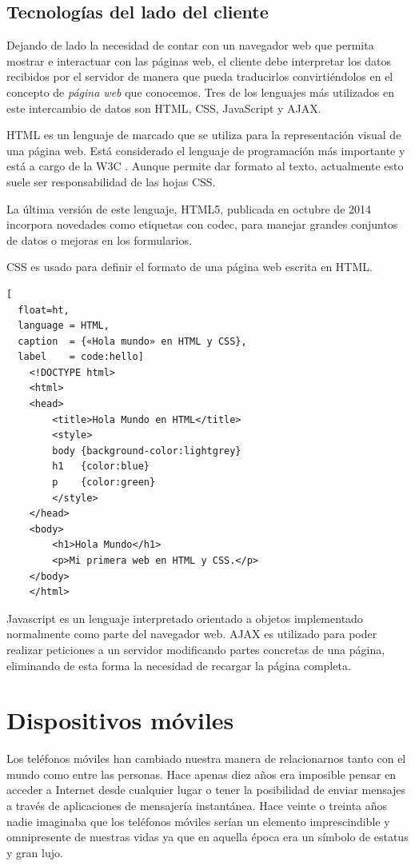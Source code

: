 \subsection{Tecnologías del lado del cliente}
Dejando de lado la necesidad de contar con un navegador web que permita mostrar e interactuar con las páginas web, el cliente debe interpretar los datos recibidos por el servidor de manera que pueda traducirlos convirtiéndolos en el concepto de \textit{página web} que conocemos. Tres de los lenguajes más utilizados en este intercambio de datos son \ac{HTML}, \ac{CSS}, JavaScript y \ac{AJAX}.

\ac{HTML} es un lenguaje de marcado que se utiliza para la representación visual de una página web. Está considerado el lenguaje de programación más importante y está a cargo de la \ac{W3C} \cite{Worl15}. Aunque permite dar formato al texto, actualmente esto suele ser responsabilidad de las hojas \ac{CSS}.

La última versión de este lenguaje, \ac{HTML}5, publicada en octubre de 2014 \cite{Adam14} incorpora novedades como etiquetas con \ac{codec}, para manejar grandes conjuntos de datos o mejoras en los formularios.

\ac{CSS} es usado para definir el formato de una página web escrita en \ac{HTML}.


\begin{lstlisting}[
  float=ht,
  language = HTML,
  caption  = {«Hola mundo» en HTML y CSS},
  label    = code:hello]
	<!DOCTYPE html>
	<html>
	<head>
	    <title>Hola Mundo en HTML</title>
		<style>
		body {background-color:lightgrey}
		h1   {color:blue}
		p    {color:green}
		</style>
	</head>
	<body>
		<h1>Hola Mundo</h1>
		<p>Mi primera web en HTML y CSS.</p>
	</body>
	</html>
\end{lstlisting}

Javascript es un lenguaje interpretado orientado a objetos implementado normalmente como parte del navegador web.
 \ac{AJAX} es utilizado para poder realizar peticiones a un servidor modificando partes concretas de una página, eliminando de esta forma la necesidad de recargar la página completa.



\section{Dispositivos móviles}
Los teléfonos móviles han cambiado nuestra manera de relacionarnos tanto con el mundo como entre las personas. Hace apenas diez años era imposible pensar en acceder a Internet desde cualquier lugar o tener la posibilidad de enviar mensajes a través de 
aplicaciones de mensajería instantánea. Hace veinte o treinta años nadie imaginaba que los teléfonos móviles serían un elemento imprescindible y omnipresente de nuestras vidas ya que en aquella época era un símbolo de estatus y gran lujo.


